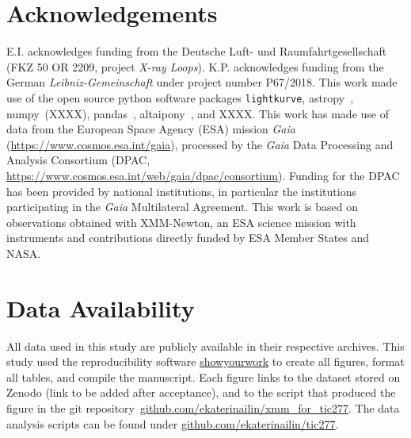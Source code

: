 \documentclass[twocolumn]{aastex631}
\begin{document}
\section*{Acknowledgements}
 E.I. acknowledges funding from the Deutsche Luft- und Raumfahrtgesellschaft (FKZ 50 OR 2209, project \textit{X-ray Loops}). K.P. acknowledges funding from the German \textit{Leibniz-Gemeinschaft} under project number P67/2018. 
This work made use of the open source python software packages \texttt{lightkurve}\citep{lightkurvecollaboration2018lightkurve}, astropy~\citep{robitaille2013astropy}, numpy~(XXXX), pandas~\citep{reback2022pandasdev}, altaipony~\citep{ilin2021altaipony}, and XXXX. This work has made use of data from the European Space Agency (ESA) mission
{\it Gaia} (\url{https://www.cosmos.esa.int/gaia}), processed by the {\it Gaia}
Data Processing and Analysis Consortium (DPAC,
\url{https://www.cosmos.esa.int/web/gaia/dpac/consortium}). Funding for the DPAC
has been provided by national institutions, in particular the institutions
participating in the {\it Gaia} Multilateral Agreement.
This work is based on observations obtained with XMM-Newton, an ESA science mission with instruments and contributions directly funded by ESA Member States and NASA.
\section*{Data Availability}
All data used in this study are publicly available in their respective archives.
This study used the reproducibility software \href{https://github.com/showyourwork/showyourwork}{showyourwork}
\citep{luger2021mappinga} to create all figures, format all tables, and compile the manuscript. Each figure links to the dataset stored on Zenodo (link to be added after acceptance), and to the script that produced the figure in the git repository~\href{https://github.com/ekaterinailin/xmm_for_tic277}{github.com/ekaterinailin/xmm\_for\_tic277}. The data analysis scripts can be found under \href{https://github.com/ekaterinailin/tic277}{github.com/ekaterinailin/tic277}. 


\end{document}
